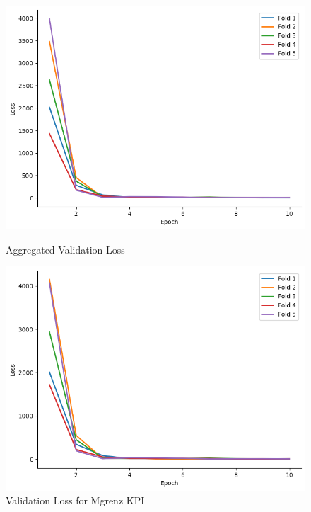 \documentclass{report} %
\begin{document}
\begin{figure}[H]
    \centering
    \begin{minipage}[b]{0.325\textwidth}
        \includegraphics[width=\textwidth]{./ReportImages/val_loss.png}
        \caption{\centering Aggregated Validation Loss}
        \label{fig:Aggregated Validation Loss}
    \end{minipage}
    \begin{minipage}[b]{0.325\textwidth}
        \includegraphics[width=\textwidth]{./ReportImages/val_loss_y1.png}
        \caption{\centering Validation Loss for Mgrenz \ac{KPI}}
        \label{fig:Validation Loss for Torque Curve}
    \end{minipage}
    \hfill
    \begin{minipage}[b]{0.325\textwidth}

\end{minipage}
\end{figure}
\end{document}
